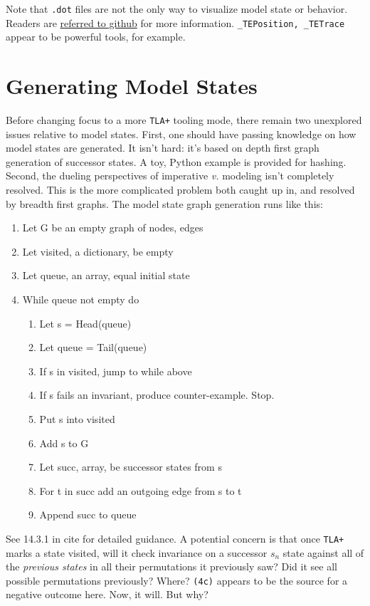 \documentclass[twocolumn]{article}
\begin{document}
Note that \texttt{.dot} files are not the only way to visualize model state or behavior. Readers are \href{https://github.com/tlaplus/tlaplus/issues/540}{referred to github} for more information. \texttt{\_TEPosition, \_TETrace} appear to be powerful tools, for example.

\section{Generating Model States}
Before changing focus to a more \texttt{TLA+} tooling mode, there remain two unexplored issues relative to model states. First, one should have passing knowledge on how model states are generated. It isn't hard: it's based on depth first graph generation of successor states. A toy, Python example is provided for hashing. Second, the dueling perspectives of imperative \emph{v.} modeling isn't completely resolved. This is the more complicated problem both caught up in, and resolved by breadth first graphs. The model state graph generation runs like this:

\begin{enumerate}
\item Let G be an empty graph of nodes, edges
\item Let visited, a dictionary, be empty
\item Let queue, an array, equal initial state
\item While queue not empty do
	\begin{enumerate}
	\item Let s = Head(queue)
	\item Let queue = Tail(queue)
	\item If s in visited, jump to while above
	\item If s fails an invariant, produce counter-example. Stop.
	\item Put s into visited
	\item Add s to G
	\item Let succ, array, be successor states from s
	\item For t in succ add an outgoing edge from s to t
	\item Append succ to queue
	\end{enumerate}
\end{enumerate}

\noindent See 14.3.1 in cite for detailed guidance. A potential concern is that once \texttt{TLA+} marks a state visited, will it check invariance on a successor $s_n$ state against all of the \emph{previous states} in all their permutations it previously saw? Did it see all possible permutations previously? Where? \texttt{(4c)} appears to be the source for a negative outcome here. Now, it will. But why?
\end{document}

